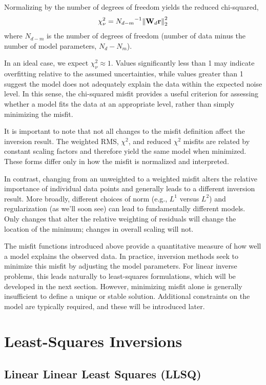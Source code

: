 Normalizing by the number of degrees of freedom yields the reduced chi-squared,
\begin{equation}
    \chi^2_\nu = {N_{d-m}}^{-1} \norm{\vb{W}_d \vb{r}}_2^2
\end{equation}
where $N_{d-m}$ is the number of degrees of freedom (number of data minus the number of model parameters, $N_d - N_m$).

In an ideal case, we expect $\chi^2_\nu \approx 1$. Values significantly less than 1 may indicate overfitting relative to the assumed uncertainties, while values greater than 1 suggest the model does not adequately explain the data within the expected noise level.  In this sense, the chi-squared misfit provides a useful criterion for assessing whether a model fits the data at an appropriate level, rather than simply minimizing the misfit.

It is important to note that not all changes to the misfit definition affect the inversion result. The weighted RMS, $\chi^2$, and reduced $\chi^2$ misfits are related by constant scaling factors and therefore yield the same model when minimized. These forms differ only in how the misfit is normalized and interpreted.

In contrast, changing from an unweighted to a weighted misfit alters the relative importance of individual data points and generally leads to a different inversion result. More broadly, different choices of norm (e.g., $L^1$ versus $L^2$) and regularization (as we'll soon see) can lead to fundamentally different models. Only changes that alter the relative weighting of residuals will change the location of the minimum; changes in overall scaling will not.

The misfit functions introduced above provide a quantitative measure of how well a model explains the observed data. In practice, inversion methods seek to minimize this misfit by adjusting the model parameters. For linear inverse problems, this leads naturally to least-squares formulations, which will be developed in the next section. However, minimizing misfit alone is generally insufficient to define a unique or stable solution. Additional constraints on the model are typically required, and these will be introduced later.


\section{Least-Squares Inversions}

\subsection{Linear Linear Least Squares (LLSQ)}\label{sec:llsq}

